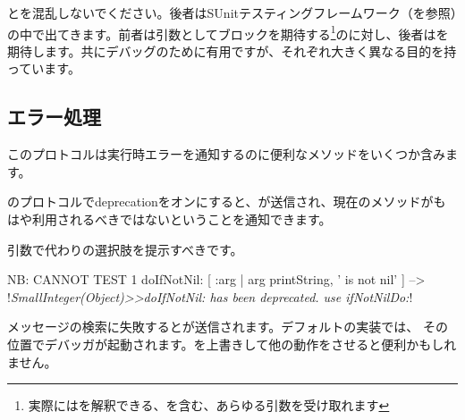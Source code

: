 \documentclass[a4paper,10pt,twoside]{book}
\begin{document}
とを混乱しないでください。後者はSUnitテスティングフレームワーク（を参照）の中で出てきます。前者は引数としてブロックを期待する\footnote{実際にはを解釈できる、を含む、あらゆる引数を受け取れます}のに対し、後者はを期待します。共にデバッグのために有用ですが、それぞれ大きく異なる目的を持っています。

\subsection{エラー処理}

このプロトコルは実行時エラーを通知するのに便利なメソッドをいくつか含みます。

のプロトコルでdeprecationをオンにすると、が送信され、現在のメソッドがもはや利用されるべきではないということを通知できます。

引数で代わりの選択肢を提示すべきです。

\begin{code}{NB: CANNOT TEST}
1 doIfNotNil: [ :arg | arg printString, ' is not nil' ]
  --> !\emph{SmallInteger(Object)>>doIfNotNil: has been deprecated. use ifNotNilDo:}!
\end{code}

メッセージの検索に失敗するとが送信されます。デフォルトの実装では、\ie {} その位置でデバッガが起動されます。を上書きして他の動作をさせると便利かもしれません。
\end{document}
